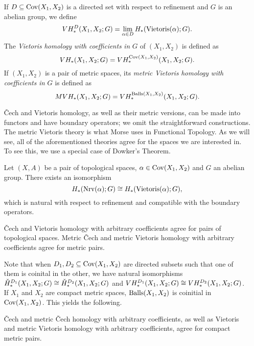 If $D\subseteq\operatorname{Cov}(X_{1},X_{2})$ is a directed set with respect to refinement and $G$ is an abelian group, we define
\[
VH_{*}^{D}(X_{1},X_{2};G)=\lim_{\alpha\in D}H_{*}(\operatorname{Vietoris}(\alpha);G).
\]
The \emph{Vietoris homology with coefficients in $G$} of $(X_{1},X_{2})$ is defined as
\[
\VH_{*}(X_{1},X_{2};G)=\VH_{*}^{\Cov(X_{1},X_{2})}(X_{1},X_{2};G).%
\]
If $(X_{1},X_{2})$ is a pair of metric spaces, its \emph{metric Vietoris homology with coefficients in $G$} is defined as
\[
\MVH_{*}(X_{1},X_{2};G)=\VH_{*}^{\Balls(X_{1},X_{2})}(X_{1},X_{2};G).%
\]

\v{C}ech and Vietoris homology, as well as their metric versions, can be made into functors and have boundary operators; we omit the straightforward constructions. The metric Vietoris theory is what Morse uses in Functional Topology. As we will see, all of the aforementioned theories agree for the spaces we are interested in. To see this, we use a special case of Dowker's Theorem.

\begin{thm}
Let $(X,A)$ be a pair of topological spaces, $\alpha\in\operatorname{Cov}(X_{1},X_{2})$ and $G$ an abelian group. There exists an isomorphism 
\[
H_{*}(\operatorname{Nrv}(\alpha);G)\cong H_{*}(\operatorname{Vietoris}(\alpha);G),
\]
which is natural with respect to refinement and compatible with the boundary operators.
\end{thm}

\begin{cor}
\v{C}ech and Vietoris homology with arbitrary coefficients agree for pairs of topological spaces. Metric \v{C}ech and metric Vietoris homology with arbitrary coefficients agree for metric pairs.
\end{cor}

Note that when $D_{1},D_{2}\subseteq\operatorname{Cov}(X_{1},X_{2})$ are directed subsets such that one of them is coinital in the other, we have natural isomorphisms $\check{H}_{*}^{D_{1}}(X_{1},X_{2};G)\cong\check{H}_{*}^{D_{2}}(X_{1},X_{2};G)$ and $VH_{*}^{D_{1}}(X_{1},X_{2};G)\cong VH_{*}^{D_{2}}(X_{1},X_{2};G)$. If $X_{1}$ and $X_{2}$ are compact metric spaces, $\operatorname{Balls}(X_{1},X_{2})$ is coinitial in $\operatorname{Cov}(X_{1},X_{2})$. This yields the following.

\begin{cor}
\v{C}ech and metric \v{C}ech homology with arbitrary coefficients, as well as Vietoris and metric Vietoris homology with arbitrary coefficients, agree for compact metric pairs.
\end{cor}

